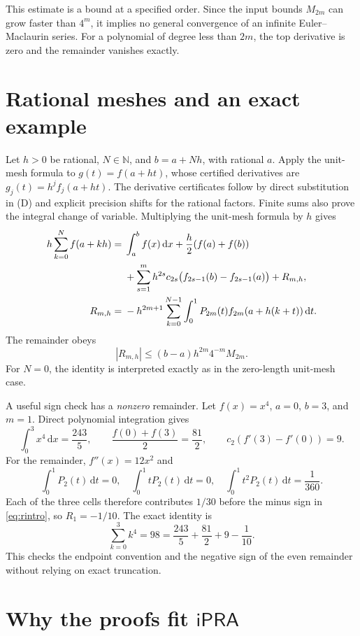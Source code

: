 \documentclass[11pt]{article}
\theoremstyle{definition}
\newcommand{\N}{\mathbb N}
\newcommand{\ipra}{\ensuremath{\mathsf{iPRA}}}
\newcommand{\abs}[1]{\left|#1\right|}
\newcommand{\dd}{\,\mathrm{d}}
\begin{document}
This estimate is a bound at a specified order.  Since the input bounds
\(M_{2m}\) can grow faster than \(4^m\), it implies no general
convergence of an infinite Euler--Maclaurin series.  For a polynomial
of degree less than \(2m\), the top derivative is zero and the
remainder vanishes exactly.

\section{Rational meshes and an exact example}\label{sec:examples}

Let \(h>0\) be rational, \(N\in\N\), and \(b=a+Nh\), with rational
\(a\).  Apply the unit-mesh formula to \(g(t)=f(a+ht)\), whose
certified derivatives are \(g_j(t)=h^jf_j(a+ht)\).  The derivative
certificates follow by direct substitution in (D) and explicit
precision shifts for the rational factors.  Finite sums also prove
the integral change of variable.  Multiplying the unit-mesh formula
by \(h\) gives
\begin{align}
 h\sum_{k=0}^Nf(a+kh)
 ={}&\int_a^b f(x)\dd x+\frac h2(f(a)+f(b))\notag\\
 &+\sum_{s=1}^m h^{2s}c_{2s}
          \bigl(f_{2s-1}(b)-f_{2s-1}(a)\bigr)+R_{m,h},
 \label{eq:scaledEM}\\
 R_{m,h}={}&-h^{2m+1}\sum_{k=0}^{N-1}\int_0^1
       P_{2m}(t)f_{2m}(a+h(k+t))\dd t.\label{eq:scaledR}
\end{align}
The remainder obeys
\[
 \abs{R_{m,h}}\le (b-a)h^{2m}4^{-m}M_{2m}.
\]
For \(N=0\), the identity is interpreted exactly as in the zero-length
unit-mesh case.

A useful sign check has a \emph{nonzero} remainder.  Let
\(f(x)=x^4\), \(a=0\), \(b=3\), and \(m=1\).  Direct polynomial
integration gives
\[
 \int_0^3x^4\dd x=\frac{243}{5},\qquad
 \frac{f(0)+f(3)}2=\frac{81}{2},\qquad
 c_2(f'(3)-f'(0))=9.
\]
For the remainder, \(f''(x)=12x^2\) and
\[
 \int_0^1P_2(t)\dd t=0,\quad
 \int_0^1tP_2(t)\dd t=0,\quad
 \int_0^1t^2P_2(t)\dd t=\frac1{360}.
\]
Each of the three cells therefore contributes \(1/30\) before the
minus sign in \eqref{eq:rintro}, so \(R_1=-1/10\).  The exact identity
is
\[
 \boxed{\displaystyle
 \sum_{k=0}^{3}k^4=98=\frac{243}{5}+\frac{81}{2}+9-\frac1{10}.}
\]
This checks the endpoint convention and the negative sign of the even
remainder without relying on exact truncation.

\section{Why the proofs fit \texorpdfstring{\ipra}{iPRA}}\label{sec:audit}
\end{document}
